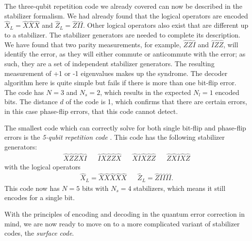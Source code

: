 The three-qubit repetition code we already covered can now be described in the stabilizer formalism. We had already found that the logical operators are encoded $\hat{X}_L = \hat{X}\hat{X}\hat{X}$ and $\hat{Z}_L = \hat{Z}\hat{I}\hat{I}$. Other logical operators also exist that are different up to a stabilizer. The stabilizer generators are needed to complete its description. We have found that two parity measurements, for example, $\hat{Z}\hat{Z}\hat{I}$ and $\hat{I}\hat{Z}\hat{Z}$, will identify the error, as they will either commute or anticommute with the error; as such, they are a set of independent stabilizer generators. The resulting measurement of +1 or -1 eigenvalues makes up the syndrome. The decoder algorithm here is quite simple but fails if there is more than one bit-flip error. The code has $N=3$ and $N_s=2$, which results in the expected $N_l = 1$ encoded bits. The distance $d$ of the code is 1, which confirms that there are certain errors, in this case phase-flip errors, that this code cannot detect.

The smallest code which can correctly solve for both single bit-flip and phase-flip errors is the \emph{5-qubit repetition code} \cite{laflamme1996perfect}. This code has the following stabilizer generators:
\begin{align*}
  \hat{X}\hat{Z}\hat{Z}\hat{X}\hat{I} && \hat{I}\hat{X}\hat{Z}\hat{Z}\hat{X} && \hat{X}\hat{I}\hat{X}\hat{Z}\hat{Z} && \hat{Z}\hat{X}\hat{I}\hat{X}\hat{Z}
\end{align*}
with the logical operators
\begin{align*}
  & \hat{X}_L = \hat{X}\hat{X}\hat{X}\hat{X}\hat{X} && \hat{Z}_L = \hat{Z}\hat{I}\hat{I}\hat{I}\hat{I}. &
\end{align*}
This code now has $N=5$ bits with $N_s = 4$ stabilizers, which means it still encodes for a single bit.

\vspace{1em}
With the principles of encoding and decoding in the quantum error correction in mind, we are now ready to move on to a more complicated variant of stabilizer codes, the \emph{surface code}. 


